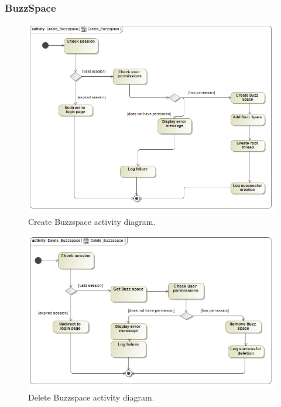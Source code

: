 \documentclass [a4paper,12pt] {article}
\begin{document}
		\subsubsection{BuzzSpace}
			\begin{figure}[H]
				\centering
				\includegraphics[width=1.0\textwidth]{CreateBuzzspaceAD.png}
				\caption{Create Buzzspace activity diagram.}
			\end{figure}
			\begin{figure}[H]
				\centering
				\includegraphics[width=1.0\textwidth]{DeleteBuzzspaceAD.png}
				\caption{Delete Buzzspace activity diagram.}
			\end{figure}
\end{document}
